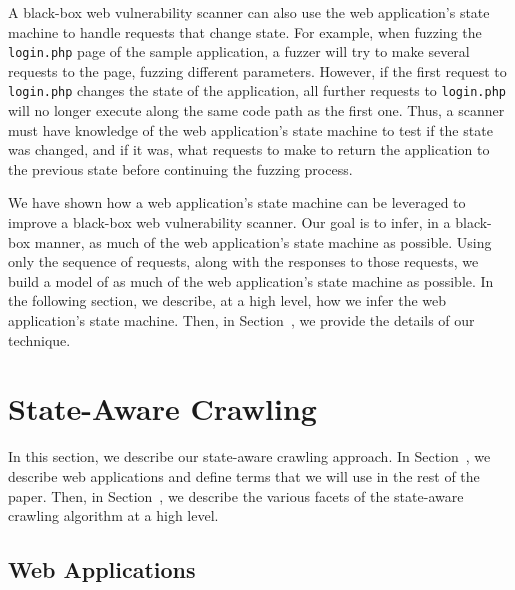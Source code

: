 A black-box web vulnerability scanner can also use the web application's state
machine to handle requests that change state. For example, when fuzzing the
\texttt{login.php} page of the sample application, a fuzzer will try to make
several requests to the page, fuzzing different parameters. However, if the
first request to \texttt{login.php} changes the state of the application, all
further requests to \texttt{login.php} will no longer execute along the same
code path as the first one. Thus, a scanner must have knowledge of the web
application's state machine to test if the state was changed, and if it was,
what requests to make to return the application to the previous state before
continuing the fuzzing process.

We have shown how a web application's state machine can be leveraged to improve
a black-box web vulnerability scanner. Our goal is to infer, in a black-box
manner, as much of the web application's state machine as possible. Using only
the sequence of requests, along with the responses to those requests, we build
a model of as much of the web application's state machine as possible. In the
following section, we describe, at a high level, how we infer the web
application's state machine. Then, in Section~, we provide the
details of our technique.

\section{State-Aware Crawling}

In this section, we describe our state-aware crawling approach. In
Section~, we describe web applications and define terms that we
will use in the rest of the paper. Then, in Section~, we
describe the various facets of the state-aware crawling algorithm at a high
level.

\subsection{Web Applications}

